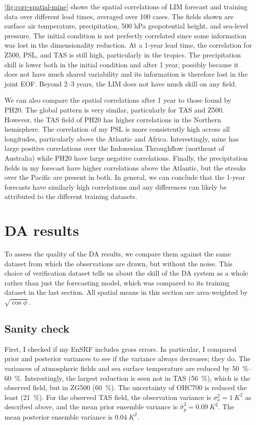 \documentclass[parskip=half,DIV=16]{scrartcl}
\begin{document}
\cref{fig:corr-spatial-mine} shows the spatial correlations of LIM forecast and training data over different lead times, averaged over 100 cases. The fields shown are surface air temperature, precipitation, 500 hPa geopotential height, and sea-level pressure. The initial condition is not perfectly correlated since some information was lost in the dimensionality reduction. At a 1-year lead time, the correlation for Z500, PSL, and TAS is still high, particularly in the tropics. The precipitation skill is lower both in the initial condition and after 1 year, possibly because it does not have much shared variability and its information is therefore lost in the joint EOF. Beyond 2--3 years, the LIM does not have much skill on any field.

We can also compare the spatial correlations after 1 year to those found by PH20. The global pattern is very similar, particularly for TAS and Z500. However, the TAS field of PH20 has higher correlations in the Northern hemisphere. The correlation of my PSL is more consistently high across all longitudes, particularly above the Atlantic and Africa. Interestingly, mine has large positive correlations over the Indonesian Throughflow (northeast of Australia) while PH20 have large negative correlations. Finally, the precipitation fields in my forecast have higher correlations above the Atlantic, but the streaks over the Pacific are present in both. In general, we can conclude that the 1-year forecasts have similarly high correlations and any differences can likely be attributed to the different training datasets.



\section{DA results}

To assess the quality of the DA results, we compare them against the same dataset from which the observations are drawn, but without the noise. This choice of verification dataset tells us about the skill of the DA system as a whole rather than just the forecasting model, which was compared to its training dataset in the last section. All spatial means in this section are area-weighted by $\sqrt{\cos\phi}$.



\subsection{Sanity check}
First, I checked if my \gls{EnSRF} includes gross errors. In particular, I compared prior and posterior variances to see if the variance always decreases; they do. The variances of atmospheric fields and sea surface temperature are reduced by \qtyrange{50}{60}{\percent}. Interestingly, the largest reduction is seen not in TAS (\qty{56}{\percent}), which is the observed field, but in ZG500 (\qty{60}{\percent}). The uncertainty of OHC700 is reduced the least (\qty{21}{\percent}). For the observed TAS field, the observation variance is $\sigma_o^2 = \qty{1}{K^2}$ as described above, and the mean prior ensemble variance is $\hat\sigma_p^2 = \qty{0.09}{K^2}$. The mean posterior ensemble variance is $\qty{0.04}{K^2}$.
\end{document}

